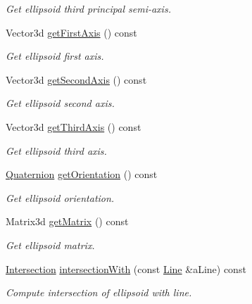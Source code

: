 \begin{DoxyCompactItemize}
\begin{DoxyCompactList}\small\item\em Get ellipsoid third principal semi-\/axis. \end{DoxyCompactList}\item 
Vector3d \hyperlink{classostk_1_1math_1_1geom_1_1d3_1_1objects_1_1_ellipsoid_a29d6b71247c279c5940c1ede221a5aac}{get\+First\+Axis} () const
\begin{DoxyCompactList}\small\item\em Get ellipsoid first axis. \end{DoxyCompactList}\item 
Vector3d \hyperlink{classostk_1_1math_1_1geom_1_1d3_1_1objects_1_1_ellipsoid_a9a694ec8f31e617d4101bd31fa1519a0}{get\+Second\+Axis} () const
\begin{DoxyCompactList}\small\item\em Get ellipsoid second axis. \end{DoxyCompactList}\item 
Vector3d \hyperlink{classostk_1_1math_1_1geom_1_1d3_1_1objects_1_1_ellipsoid_a2e12dada2181d15c8cf4cef2abf3d2ea}{get\+Third\+Axis} () const
\begin{DoxyCompactList}\small\item\em Get ellipsoid third axis. \end{DoxyCompactList}\item 
\hyperlink{classostk_1_1math_1_1geom_1_1d3_1_1trf_1_1rot_1_1_quaternion}{Quaternion} \hyperlink{classostk_1_1math_1_1geom_1_1d3_1_1objects_1_1_ellipsoid_a3e273d94d0ff1d40e3588d5ee2366ec9}{get\+Orientation} () const
\begin{DoxyCompactList}\small\item\em Get ellipsoid orientation. \end{DoxyCompactList}\item 
Matrix3d \hyperlink{classostk_1_1math_1_1geom_1_1d3_1_1objects_1_1_ellipsoid_aea24d2d268d701c31a18f2ddac2cd394}{get\+Matrix} () const
\begin{DoxyCompactList}\small\item\em Get ellipsoid matrix. \end{DoxyCompactList}\item 
\hyperlink{classostk_1_1math_1_1geom_1_1d3_1_1_intersection}{Intersection} \hyperlink{classostk_1_1math_1_1geom_1_1d3_1_1objects_1_1_ellipsoid_a18e2c5add63d0f1ed857a3cda95ceb10}{intersection\+With} (const \hyperlink{classostk_1_1math_1_1geom_1_1d3_1_1objects_1_1_line}{Line} \&a\+Line) const
\begin{DoxyCompactList}\small\item\em Compute intersection of ellipsoid with line. \end{DoxyCompactList}\item 

\end{DoxyCompactItemize}
